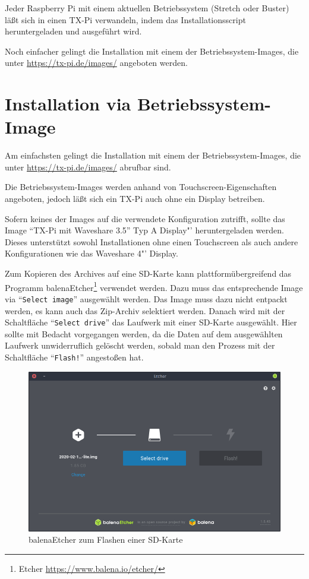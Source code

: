 \documentclass[
  paper=A4,
  ngerman,
  fontsize=12pt,
  parskip=half-,
]{scrbook}
\begin{document}
Jeder Raspberry Pi mit einem aktuellen Betriebssystem (Stretch oder Buster) läßt 
sich in einen TX-Pi verwandeln, indem das Installationsscript heruntergeladen
und ausgeführt wird.

Noch einfacher gelingt die Installation mit einem der Betriebssystem-Images,
die unter \url{https://tx-pi.de/images/} angeboten werden.

\section{Installation via Betriebssystem-Image}\label{sec:image}

Am einfachsten gelingt die Installation mit einem der Betriebssystem-Images,
die unter \url{https://tx-pi.de/images/} abrufbar sind.

Die Betriebssystem-Images werden anhand von Touchscreen-Eigenschaften 
angeboten, jedoch läßt sich ein TX-Pi auch ohne ein Display
betreiben.

Sofern keines der Images auf die verwendete Konfiguration zutrifft, 
sollte das Image "`TX-Pi mit Waveshare 3.5"' Typ A Display"'  heruntergeladen werden. 
Dieses unterstützt sowohl Installationen ohne einen 
Touchscreen als auch andere Konfigurationen wie das Waveshare
4"' Display.

Zum Kopieren des Archives auf eine SD-Karte kann plattformübergreifend
das Programm balenaEtcher\footnote{Etcher \url{https://www.balena.io/etcher/}} verwendet werden.
Dazu muss das entsprechende Image via "`\texttt{Select image}"' ausgewählt
werden. Das Image muss dazu nicht entpackt werden, es kann auch das
Zip-Archiv selektiert werden. Danach wird mit der Schaltfläche "`\texttt{Select drive}"'
das Laufwerk mit einer SD-Karte ausgewählt. Hier sollte mit Bedacht vorgegangen
werden, da die Daten auf dem ausgewählten Laufwerk unwiderruflich gelöscht
werden, sobald man den Prozess mit der Schaltfläche "`\texttt{Flash!}"' angestoßen
hat.
\clearpage

\begin{figure}[ht]
\centering
\includegraphics[scale=0.45]{images/etcher.png}
\caption{balenaEtcher zum Flashen einer SD-Karte}
\end{figure}
\end{document}
